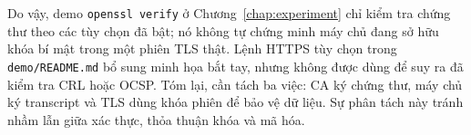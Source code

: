 Do vậy, demo \texttt{openssl verify} ở Chương~\ref{chap:experiment} chỉ kiểm tra chứng thư theo các tùy chọn đã bật; nó không tự chứng minh máy chủ đang sở hữu khóa bí mật trong một phiên TLS thật. Lệnh HTTPS tùy chọn trong \texttt{demo/README.md} bổ sung minh họa bắt tay, nhưng không được dùng để suy ra đã kiểm tra CRL hoặc OCSP. Tóm lại, cần tách ba việc: CA ký chứng thư, máy chủ ký transcript và TLS dùng khóa phiên để bảo vệ dữ liệu. Sự phân tách này tránh nhầm lẫn giữa xác thực, thỏa thuận khóa và mã hóa.
